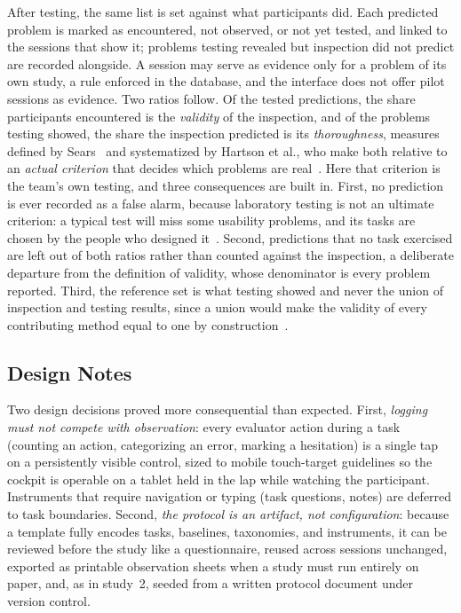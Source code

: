 \documentclass[conference]{IEEEtran}
\begin{document}
After testing, the same list is set against what participants did. Each
predicted problem is marked as encountered, not observed, or not yet
tested, and linked to the sessions that show it; problems testing revealed
but inspection did not predict are recorded alongside. A session may serve
as evidence only for a problem of its own study, a rule enforced in the
database, and the interface does not offer pilot sessions as evidence. Two ratios
follow. Of the tested predictions, the share participants encountered is
the \emph{validity} of the inspection, and of the problems testing showed,
the share the inspection predicted is its \emph{thoroughness}, measures
defined by Sears~\cite{sears1997heuristic} and systematized by Hartson et
al., who make both relative to an \emph{actual criterion} that decides
which problems are real~\cite{hartson2001criteria}. Here that criterion is
the team's own testing, and three consequences are built in. First, no
prediction is ever recorded as a false alarm, because laboratory testing is
not an ultimate criterion: a typical test will miss some usability
problems, and its tasks are chosen by the people who designed
it~\cite{hartson2001criteria}. Second, predictions that no task exercised
are left out of both ratios rather than counted against the inspection, a
deliberate departure from the definition of validity, whose denominator is
every problem reported. Third, the reference set is what testing showed and
never the union of inspection and testing results, since a union would make
the validity of every contributing method equal to one by
construction~\cite{hartson2001criteria}.

\subsection{Design Notes}
Two design decisions proved more consequential than expected. First,
\emph{logging must not compete with observation}: every evaluator action
during a task (counting an action, categorizing an error, marking a
hesitation) is a single tap on a persistently visible control, sized to
mobile touch-target guidelines so the cockpit is operable on a tablet
held in the lap while watching the participant. Instruments that require
navigation or typing (task questions, notes) are deferred to task
boundaries. Second, \emph{the protocol is an artifact, not
configuration}: because a template fully encodes tasks, baselines,
taxonomies, and instruments, it can be reviewed before the study like a
questionnaire, reused across sessions unchanged, exported as printable
observation sheets when a study must run entirely on paper, and, as in
study~2, seeded from a written protocol document under version control.
\end{document}
